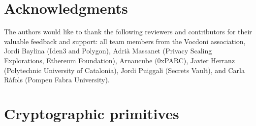 \documentclass{llncs}
\begin{document}
\section*{Acknowledgments}
\label{sec:acknowledgments}

The authors would like to thank the following reviewers and contributors for their valuable feedback and support: all team members from the Vocdoni association, Jordi Baylina (Iden3 and Polygon), Adrià Massanet (Privacy Scaling Explorations, Ethereum Foundation), Arnaucube (0xPARC), Javier Herranz (Polytechnic University of Catalonia), Jordi Puiggali (Secrets Vault), and Carla Ràfols (Pompeu Fabra University).






\appendix

\section{Cryptographic primitives} %
\label{sec:cryptographic-primitives}

\end{document}

